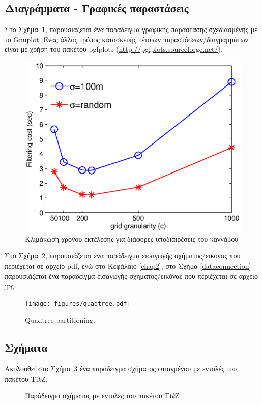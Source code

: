\subsection{Διαγράμματα - Γραφικές παραστάσεις}
Στο Σχήμα~\ref{fig1}, παρουσιάζεται ένα παράδειγμα γραφικής παράστασης σχεδιασμένης με το Gnuplot. Ένας άλλος τρόπος κατασκευής τέτοιων παραστάσεων/διαγραμμάτων είναι με χρήση του πακέτου pgfplots (\url{http://pgfplots.sourceforge.net/}).
\begin{figure}[htb]
\includegraphics[scale=0.7]{figures/grid_granularity.eps}
\centering
\caption{Κλιμάκωση χρόνου εκτέλεσης για διάφορες υποδιαιρέσεις του καννάβου}	
\label{fig1}
\end{figure} 

Στο Σχήμα~\ref{Quadtree}, παρουσιάζεται ένα παράδειγμα εισαγωγής σχήματος/εικόνας που περιέχεται σε αρχείο pdf, ενώ στο Κεφάλαιο \ref{chap2}, στο Σχήμα \ref{dataconnection} παρουσιάζεται ένα παράδειγμα εισαγωγής σχήματος/εικόνας που περιέχεται σε αρχείο jpg.
\begin{figure}[htb]
\centering
\texttt{[image: figures/quadtree.pdf]}
\caption{Quadtree partitioning.}
\label{Quadtree}
\end{figure}

\subsection{Σχήματα}
Ακολουθεί στο Σχήμα~\ref{fig2} ένα παράδειγμα σχήματος φτιαγμένου με εντολές του πακέτου Ti\textit{k}Z.
\begin{figure}[htb]
\begin{center}
\end{center}
\caption{Παράδειγμα σχήματος με εντολές του πακέτου Ti\textit{k}Z}	
\label{fig2}
\end{figure}

